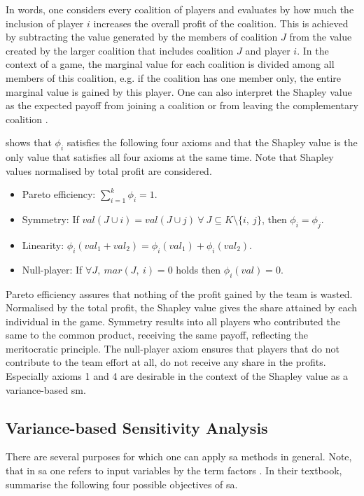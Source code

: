 In words, one considers every coalition of players and evaluates by how much the inclusion of player $i$ increases the overall profit of the coalition. This is achieved by subtracting the value generated by the members of coalition $J$ from the value created by the larger coalition that includes coalition $J$ and player $i$. In the context of a game, the marginal value for each coalition is divided among all members of this coalition, e.g. if the coalition has one member only, the entire marginal value is gained by this player. One can also interpret the Shapley value as the expected payoff from joining a coalition or from leaving the complementary coalition \citep{PRB20}.

\citet{S53} shows that $\phi_i$ satisfies the following four axioms and that the Shapley value is the only value that satisfies all four axioms at the same time. Note that Shapley values normalised by total profit are considered.

\begin{itemize}
    \item Pareto efficiency: $\sum_{i=1}^{k}\phi_i=1$.
	\item Symmetry: If $val(J \cup {i})=val(J \cup {j})\ \forall\ J \subseteq K \setminus{\{i,\ j\}}$, then $\phi_i = \phi_j$.
	\item Linearity: $\phi_i(val_1 + val_2)=\phi_i(val_1)+\phi_i(val_2)$.
	\item Null-player: If $\forall J,\ mar(J,\ i) = 0$ holds then $\phi_i(val) = 0$.
\end{itemize}

Pareto efficiency assures that nothing of the profit gained by the team is wasted. Normalised by the total profit, the Shapley value gives the share attained by each individual in the game. Symmetry results into all players who contributed the same to the common product, receiving the same payoff, reflecting the meritocratic principle. The null-player axiom ensures that players that do not contribute to the team effort at all, do not receive any share in the profits. Especially axioms 1 and 4 are desirable in the context of the Shapley value as a variance-based sm.

\subsection{Variance-based Sensitivity Analysis} \label{var_based_sa}

There are several purposes for which one can apply sa methods in general. Note, that in sa one refers to input variables by the term factors \citep{R21}. In their textbook, \citet{STC04} summarise the following four possible objectives of sa.

